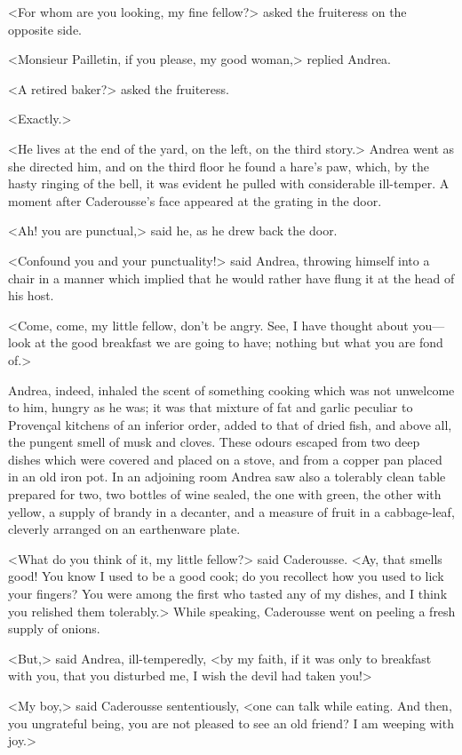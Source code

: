  <For whom are you looking, my fine fellow?> asked the fruiteress on the opposite side. 

 <Monsieur Pailletin, if you please, my good woman,> replied Andrea. 

 <A retired baker?> asked the fruiteress. 

 <Exactly.> 

 <He lives at the end of the yard, on the left, on the third story.>  Andrea went as she directed him, and on the third floor he found a hare's paw, which, by the hasty ringing of the bell, it was evident he pulled with considerable ill-temper. A moment after Caderousse's face appeared at the grating in the door. 

 <Ah! you are punctual,> said he, as he drew back the door. 

 <Confound you and your punctuality!> said Andrea, throwing himself into a chair in a manner which implied that he would rather have flung it at the head of his host. 

 <Come, come, my little fellow, don't be angry. See, I have thought about you—look at the good breakfast we are going to have; nothing but what you are fond of.> 

 Andrea, indeed, inhaled the scent of something cooking which was not unwelcome to him, hungry as he was; it was that mixture of fat and garlic peculiar to Provençal kitchens of an inferior order, added to that of dried fish, and above all, the pungent smell of musk and cloves. These odours escaped from two deep dishes which were covered and placed on a stove, and from a copper pan placed in an old iron pot. In an adjoining room Andrea saw also a tolerably clean table prepared for two, two bottles of wine sealed, the one with green, the other with yellow, a supply of brandy in a decanter, and a measure of fruit in a cabbage-leaf, cleverly arranged on an earthenware plate. 

 <What do you think of it, my little fellow?> said Caderousse. <Ay, that smells good! You know I used to be a good cook; do you recollect how you used to lick your fingers? You were among the first who tasted any of my dishes, and I think you relished them tolerably.> While speaking, Caderousse went on peeling a fresh supply of onions. 

 <But,> said Andrea, ill-temperedly, <by my faith, if it was only to breakfast with you, that you disturbed me, I wish the devil had taken you!> 

 <My boy,> said Caderousse sententiously, <one can talk while eating. And then, you ungrateful being, you are not pleased to see an old friend? I am weeping with joy.> 

